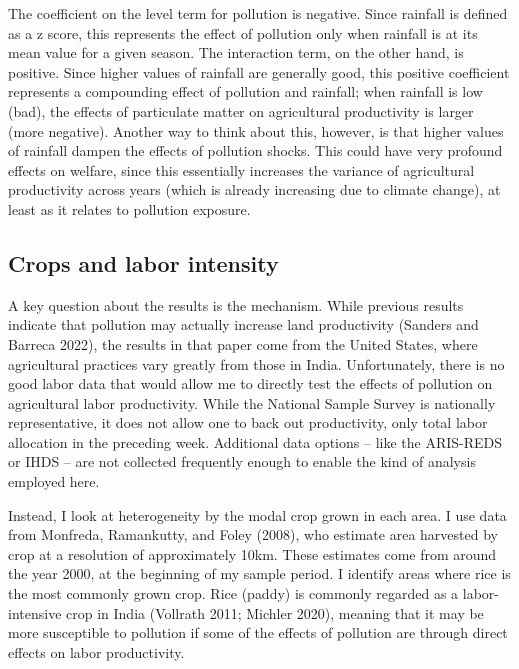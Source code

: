 \documentclass[
]{article}
\begin{document}
The coefficient on the level term for pollution is negative. Since rainfall is defined as a z score, this represents the effect of pollution only when rainfall is at its mean value for a given season. The interaction term, on the other hand, is positive. Since higher values of rainfall are generally good, this positive coefficient represents a compounding effect of pollution and rainfall; when rainfall is low (bad), the effects of particulate matter on agricultural productivity is larger (more negative). Another way to think about this, however, is that higher values of rainfall dampen the effects of pollution shocks. This could have very profound effects on welfare, since this essentially increases the variance of agricultural productivity across years (which is already increasing due to climate change), at least as it relates to pollution exposure.

\hypertarget{crops-and-labor-intensity}{%
\subsection{Crops and labor intensity}\label{crops-and-labor-intensity}}

A key question about the results is the mechanism. While previous results indicate that pollution may actually increase land productivity (Sanders and Barreca 2022), the results in that paper come from the United States, where agricultural practices vary greatly from those in India. Unfortunately, there is no good labor data that would allow me to directly test the effects of pollution on agricultural labor productivity. While the National Sample Survey is nationally representative, it does not allow one to back out productivity, only total labor allocation in the preceding week. Additional data options -- like the ARIS-REDS or IHDS -- are not collected frequently enough to enable the kind of analysis employed here.

Instead, I look at heterogeneity by the modal crop grown in each area. I use data from Monfreda, Ramankutty, and Foley (2008), who estimate area harvested by crop at a resolution of approximately 10km. These estimates come from around the year 2000, at the beginning of my sample period. I identify areas where rice is the most commonly grown crop. Rice (paddy) is commonly regarded as a labor-intensive crop in India (Vollrath 2011; Michler 2020), meaning that it may be more susceptible to pollution if some of the effects of pollution are through direct effects on labor productivity.
\end{document}
